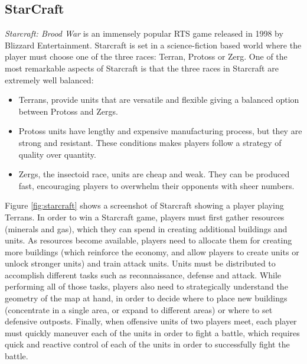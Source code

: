 \documentclass[journal]{IEEEtran}
\begin{document}
\subsection{StarCraft}\label{subsec:starcraft}

{\em Starcraft: Brood War} is an immensely popular RTS game released in 1998 by Blizzard Entertainment. Starcraft is set in a science-fiction based world where the player must choose one of the three races: Terran, Protoss or Zerg. One of the most remarkable aspects of Starcraft is that the three races in Starcraft are extremely well balanced:

\begin{itemize}
	\item Terrans, provide units that are versatile and flexible giving a balanced option between Protoss and Zergs.
	\item Protoss units have lengthy and expensive manufacturing process, but they are strong and resistant. These conditions makes players follow a strategy of quality over quantity.
	\item Zergs, the insectoid race, units are cheap and weak. They can be produced fast, encouraging players to overwhelm their opponents with sheer numbers.
\end{itemize}


Figure \ref{fig:starcraft} shows a screenshot of Starcraft showing a player playing Terrans. In order to win a Starcraft game, players must first gather resources (minerals and gas), which they can spend in creating additional buildings and units. As resources become available, players need to allocate them for creating more buildings (which reinforce the economy, and allow players to create units or unlock stronger units) and train attack units. Units must be distributed to accomplish different tasks such as reconnaissance, defense and attack. While performing all of those tasks, players also need to strategically understand the geometry of the map at hand, in order to decide where to place new buildings (concentrate in a single area, or expand to different areas) or where to set defensive outposts. Finally, when offensive units of two players meet, each player must quickly maneuver each of the units in order to fight a battle, which requires quick and reactive control of each of the units in order to successfully fight the battle. 
\end{document}
